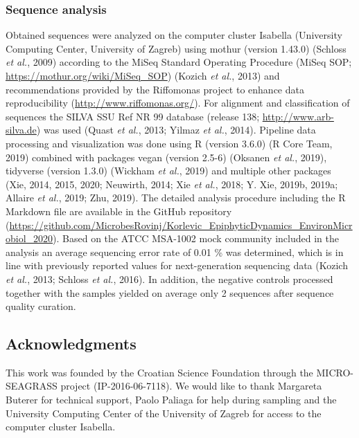 \documentclass[12pt,]{article}
\begin{document}
\hypertarget{sequence-analysis}{%
\subsubsection{Sequence analysis}\label{sequence-analysis}}

Obtained sequences were analyzed on the computer cluster Isabella
(University Computing Center, University of Zagreb) using mothur
(version 1.43.0) (Schloss \emph{et al.}, 2009) according to the MiSeq
Standard Operating Procedure (MiSeq SOP;
\url{https://mothur.org/wiki/MiSeq_SOP}) (Kozich \emph{et al.}, 2013)
and recommendations provided by the Riffomonas project to enhance data
reproducibility (\url{http://www.riffomonas.org/}). For alignment and
classification of sequences the SILVA SSU Ref NR 99 database (release
138; \url{http://www.arb-silva.de}) was used (Quast \emph{et al.}, 2013;
Yilmaz \emph{et al.}, 2014). Pipeline data processing and visualization
was done using R (version 3.6.0) (R Core Team, 2019) combined with
packages vegan (version 2.5-6) (Oksanen \emph{et al.}, 2019), tidyverse
(version 1.3.0) (Wickham \emph{et al.}, 2019) and multiple other
packages (Xie, 2014, 2015, 2020; Neuwirth, 2014; Xie \emph{et al.},
2018; Y. Xie, 2019b, 2019a; Allaire \emph{et al.}, 2019; Zhu, 2019). The
detailed analysis procedure including the R Markdown file are available
in the GitHub repository
(\url{https://github.com/MicrobesRovinj/Korlevic_EpiphyticDynamics_EnvironMicrobiol_2020}).
Based on the ATCC MSA-1002 mock community included in the analysis an
average sequencing error rate of 0.01 \si{\percent} was determined,
which is in line with previously reported values for next-generation
sequencing data (Kozich \emph{et al.}, 2013; Schloss \emph{et al.},
2016). In addition, the negative controls processed together with the
samples yielded on average only 2 sequences after sequence quality
curation.

\hypertarget{acknowledgments}{%
\subsection{Acknowledgments}\label{acknowledgments}}

This work was founded by the Croatian Science Foundation through the
MICRO-SEAGRASS project (IP-2016-06-7118). We would like to thank
Margareta Buterer for technical support, Paolo Paliaga for help during
sampling and the University Computing Center of the University of Zagreb
for access to the computer cluster Isabella.
\end{document}

